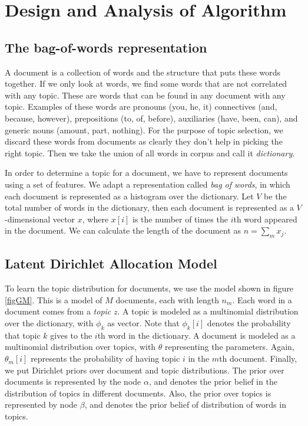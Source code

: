 \documentclass[twoside,12pt]{article}
\begin{document}
\section{Design and Analysis of Algorithm}

\subsection{The bag-of-words representation}
A document is a collection of words and the structure that puts these words together. If we only look at words, we find some words that are not correlated with any topic. These are words that can be found in any document with any topic. Examples of these words are pronouns (you, he, it) connectives (and, because, however), prepositions (to, of, before), auxiliaries (have, been, can), and generic nouns (amount, part, nothing). For the purpose of topic selection, we discard these words from documents as clearly they don't help in picking the right topic. Then we take the union of all words in corpus and call it \emph{dictionary}.

In order to determine a topic for a document, we have to represent  documents using a set of features. We adapt a representation called \emph{bag of words}, in which each document is represented as a histogram over the dictionary. Let $V$ be the total number of words in the dictionary, then each document is represented as a $V$-dimensional vector $x$, where $x[i]$ is the number of times the $i$th word appeared in the document. We can calculate the length of the document as $n=\sum_{m}x_j.$

\subsection{Latent Dirichlet Allocation Model}
To learn the topic distribution for documents, we use the model shown in figure \ref{figGM}. This is a model of $M$ documents, each with length $n_m$. Each word in a document comes from a \emph{topic} $z$. A topic is modeled as a multinomial distribution over the dictionary, with $\phi_k$ as vector. Note that $\phi_k[i]$ denotes the probability that topic $k$ gives to the $i$th word in the dictionary. A document is modeled as a multinomial distribution over topics, with $\theta$ representing the parameters. Again, $\theta_m[i]$ represents the probability of having topic $i$ in the $m$th document. Finally, we put Dirichlet priors over document and topic distributions. The prior over documents is represented by the node $\alpha$, and denotes the prior belief in the distribution of topics in different documents. Also, the prior over topics is represented by node $\beta$, and denotes the prior belief of distribution of words in topics.
\end{document}
